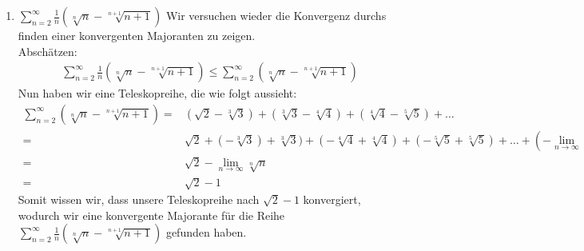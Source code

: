 \begin{lsg}
\begin{enumerate}[label=$\mathrm{(\roman*)}$, ref=$\mathrm{\roman*}$]
\item $\sum^{\infty}_{n=2}\frac{1}{n}(\sqrt[n]{n}-\sqrt[n+1]{n+1})$ Wir versuchen wieder die Konvergenz durchs finden einer konvergenten Majoranten zu zeigen. \\
Abschätzen:
\begin{align*}
\sum^{\infty}_{n=2}\frac{1}{n}(\sqrt[n]{n}-\sqrt[n+1]{n+1}) \leq \sum^{\infty}_{n=2}(\sqrt[n]{n}-\sqrt[n+1]{n+1})
\end{align*}
Nun haben wir eine Teleskopreihe, die wie folgt aussieht:
\begin{align*}
\sum^{\infty}_{n=2}(\sqrt[n]{n}-\sqrt[n+1]{n+1}) = &(\sqrt{2} - \sqrt[3]{3}) + (\sqrt[3]{3} - \sqrt[4]{4}) + (\sqrt[4]{4} - \sqrt[5]{5}) + \ldots \\
= &\sqrt{2} + (-\sqrt[3]{3}) + \sqrt[3]{3}) + (-\sqrt[4]{4} + \sqrt[4]{4}) + (-\sqrt[5]{5} + \sqrt[5]{5}) + \ldots + (-\lim_{n \to \infty} \sqrt[n]{n}) \\
= &\sqrt{2} - \lim_{n \to \infty} \sqrt[n]{n} \\
= &\sqrt{2} - 1
\end{align*}
Somit wissen wir, dass unsere Teleskopreihe nach $\sqrt{2} - 1$ konvergiert, wodurch wir eine konvergente Majorante für die Reihe $\sum^{\infty}_{n=2}\frac{1}{n}(\sqrt[n]{n}-\sqrt[n+1]{n+1})$ gefunden haben.


\end{enumerate}
\end{lsg}
